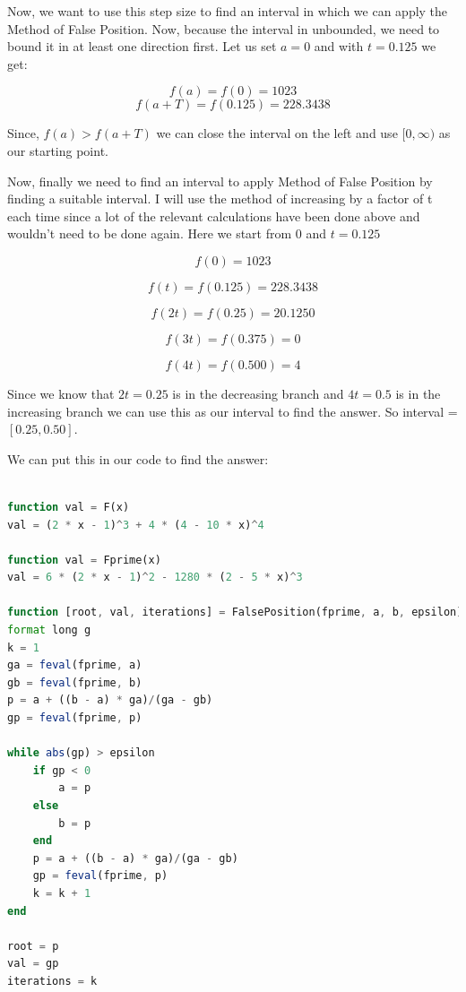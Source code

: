 \documentclass[a4paper]{article}
\begin{document}
Now, we want to use this step size to find an interval in which we can apply the Method of False Position. Now, because the interval in unbounded, we need to bound it in at least one direction first. Let us set $a = 0$ and with $t = 0.125$ we get: 

\begin{equation}
f(a) = f(0) = 1023
\end{equation}
\begin{equation}
f(a + T) = f(0.125) = 228.3438
\end{equation}

Since, $f(a) > f(a + T)$ we can close the interval on the left and use $[0, \infty)$ as our starting point. 

Now, finally we need to find an interval to apply Method of False Position by finding a suitable interval. I will use the method of increasing by a factor of t each time since a lot of the relevant calculations have been done above and wouldn't need to be done again. Here we start from 0 and $t = 0.125$

\begin{equation}
f(0) = 1023
\end{equation}

\begin{equation}
f(t) = f(0.125) = 228.3438
\end{equation}

\begin{equation}
f(2t) = f(0.25) = 20.1250
\end{equation}

\begin{equation}
f(3t) = f(0.375) = 0
\end{equation}

\begin{equation}
f(4t) = f(0.500) = 4
\end{equation}

Since we know that $2t = 0.25$ is in the decreasing branch and $4t = 0.5$ is in the increasing branch we can use this as our interval to find the answer. So interval = $[0.25, 0.50]$.

We can put this in our code to find the answer: 

\begin{lstlisting}[language=Octave]

function val = F(x)
val = (2 * x - 1)^3 + 4 * (4 - 10 * x)^4

function val = Fprime(x)
val = 6 * (2 * x - 1)^2 - 1280 * (2 - 5 * x)^3

function [root, val, iterations] = FalsePosition(fprime, a, b, epsilon)
format long g
k = 1
ga = feval(fprime, a)
gb = feval(fprime, b)
p = a + ((b - a) * ga)/(ga - gb)
gp = feval(fprime, p)

while abs(gp) > epsilon
    if gp < 0
        a = p
    else
        b = p
    end
    p = a + ((b - a) * ga)/(ga - gb)
    gp = feval(fprime, p)
    k = k + 1
end

root = p
val = gp
iterations = k

\end{lstlisting}
\end{document}
